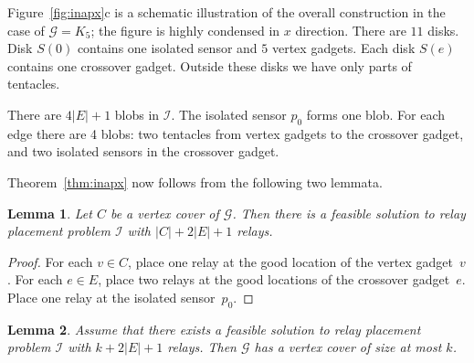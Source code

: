 \documentclass[11pt,a4paper]{article}
\newcommand{\s}[1]{{\lvert #1 \rvert}}
\newcommand{\myG}{\mathcal{G}}
\newcommand{\myI}{\mathcal{I}}
\newtheorem{lemma}{Lemma}
\theoremstyle{definition}
\theoremstyle{remark}
\begin{document}
Figure~\ref{fig:inapx}c is a schematic illustration of the overall construction in the case of $\myG = K_5$; the figure is highly condensed in $x$ direction. There are $11$ disks. Disk $S(0)$ contains one isolated sensor and $5$ vertex gadgets. Each disk $S(e)$ contains one crossover gadget. Outside these disks we have only parts of tentacles.

There are $4 \s{E} + 1$ blobs in $\myI$. The isolated sensor $p_0$ forms one blob. For each edge there are 4 blobs: two tentacles from vertex gadgets to the crossover gadget, and two isolated sensors in the crossover gadget.

Theorem~\ref{thm:inapx} now follows from the following two lemmata.

\begin{lemma}\label{lem:inapx-a}
    Let\/ $C$ be a vertex cover of\/ $\myG$. Then there is a feasible solution to relay placement problem\/ $\myI$ with\/ $\s{C} + 2\s{E} + 1$ relays.
\end{lemma}

\begin{proof}
    For each $v \in C$, place one relay at the good location of the vertex gadget~$v$. For each $e \in E$, place two relays at the good locations of the crossover gadget~$e$. Place one relay at the isolated sensor~$p_0$.
\end{proof}

\begin{lemma}\label{lem:inapx-b}
    Assume that there exists a feasible solution to relay placement problem\/ $\myI$ with\/ $k + 2\s{E} + 1$ relays. Then\/ $\myG$ has a vertex cover of size at most\/ $k$.
\end{lemma}
\end{document}

